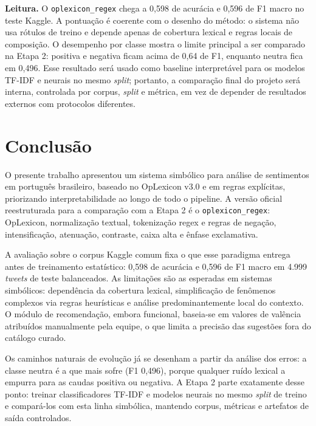 \documentclass[11pt,a4paper]{article}
\begin{document}
\textbf{Leitura.} O \texttt{oplexicon\_regex} chega a 0,598 de acurácia e 0,596 de F1 macro no teste Kaggle. A pontuação é coerente com o desenho do método: o sistema não usa rótulos de treino e depende apenas de cobertura lexical e regras locais de composição. O desempenho por classe mostra o limite principal a ser comparado na Etapa 2: positiva e negativa ficam acima de 0,64 de F1, enquanto neutra fica em 0,496. Esse resultado será usado como baseline interpretável para os modelos TF-IDF e neurais no mesmo \emph{split}; portanto, a comparação final do projeto será interna, controlada por corpus, \emph{split} e métrica, em vez de depender de resultados externos com protocolos diferentes.

\section{Conclusão}
\label{sec:conclusao}

O presente trabalho apresentou um sistema simbólico para análise de sentimentos em português brasileiro, baseado no OpLexicon v3.0 e em regras explícitas, priorizando interpretabilidade ao longo de todo o pipeline. A versão oficial reestruturada para a comparação com a Etapa 2 é o \texttt{oplexicon\_regex}: OpLexicon, normalização textual, tokenização regex e regras de negação, intensificação, atenuação, contraste, caixa alta e ênfase exclamativa.

A avaliação sobre o corpus Kaggle comum fixa o que esse paradigma entrega antes de treinamento estatístico: 0,598 de acurácia e 0,596 de F1 macro em 4.999 \emph{tweets} de teste balanceados. As limitações são as esperadas em sistemas simbólicos: dependência da cobertura lexical, simplificação de fenômenos complexos via regras heurísticas e análise predominantemente local do contexto. O módulo de recomendação, embora funcional, baseia-se em valores de valência atribuídos manualmente pela equipe, o que limita a precisão das sugestões fora do catálogo curado.

Os caminhos naturais de evolução já se desenham a partir da análise dos erros: a classe neutra é a que mais sofre (F1 0,496), porque qualquer ruído lexical a empurra para as caudas positiva ou negativa. A Etapa 2 parte exatamente desse ponto: treinar classificadores TF-IDF e modelos neurais no mesmo \emph{split} de treino e compará-los com esta linha simbólica, mantendo corpus, métricas e artefatos de saída controlados.



\end{document}
